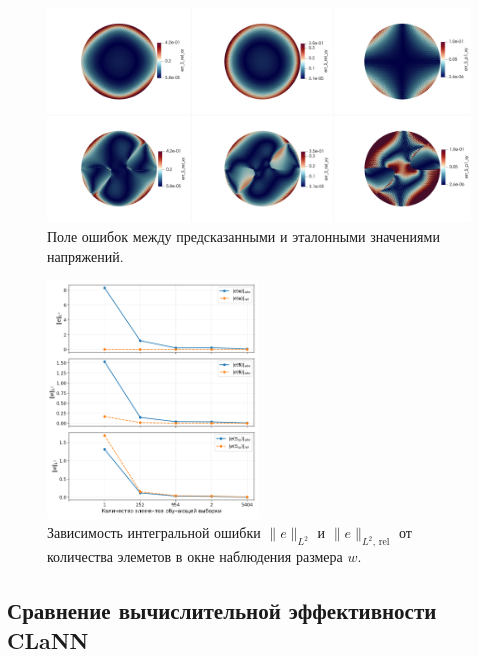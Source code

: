   
  \begin{figure}[H]
    \centering
    \includegraphics[width=1.0\textwidth]{img/Numerical/errs.png}
    \caption{Поле ошибок между предсказанными и эталонными значениями напряжений.}
    \label{fig:numerical_errors}
  \end{figure}

  \begin{figure}[H]
    \centering
    \includegraphics[width=0.5\textwidth]{img/integral_errors.png}
    \caption{Зависимость интегральной ошибки $\|e\|_{L^2}$ и $\|e\|_{L^2,\,\mathrm{rel}}$ от количества элеметов в окне наблюдения размера $w$.}
    \label{fig:integral_errors}
  \end{figure}
  
  
\subsection{Сравнение вычислительной эффективности CLaNN}

